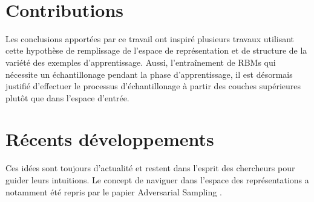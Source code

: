 \begin{center}
\\
\end{center} 

\section{Contributions}

Les conclusions apportées par ce travail ont inspiré plusieurs travaux
utilisant cette hypothèse de remplissage de l'espace de représentation et de
structure de la variété des exemples d'apprentissage. Aussi, l'entraînement de
RBMs qui nécessite un échantillonage pendant la phase d'apprentissage, il est
désormais justifié d'effectuer le processus d'échantillonage à partir des
couches supérieures plutôt que dans l'espace d'entrée.

\section{R\'{e}cents d\'{e}veloppements}

Ces idées sont toujours d'actualité et restent dans l'esprit des chercheurs
pour guider leurs intuitions. Le concept de naviguer dans l'espace des
représentations a notamment été repris par le papier Adversarial Sampling
\citep{Goodfellow-et-al-ARXIV2014}.
